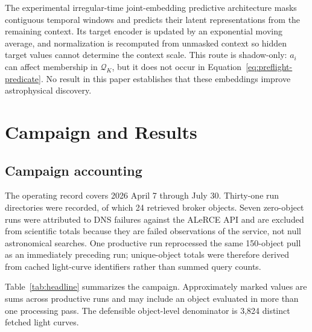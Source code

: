 \documentclass[11pt]{article}
\begin{document}
The experimental irregular-time joint-embedding predictive architecture masks contiguous temporal windows and predicts their latent representations from the remaining context. Its target encoder is updated by an exponential moving average, and normalization is recomputed from unmasked context so hidden target values cannot determine the context scale. This route is shadow-only: $a_i$ can affect membership in $\mathcal{Q}_K$, but it does not occur in Equation~\ref{eq:preflight-predicate}. No result in this paper establishes that these embeddings improve astrophysical discovery.

\section{Campaign and Results}
\label{sec:campaign}

\subsection{Campaign accounting}

The operating record covers 2026 April 7 through July 30. Thirty-one run directories were recorded, of which 24 retrieved broker objects. Seven zero-object runs were attributed to DNS failures against the ALeRCE API and are excluded from scientific totals because they are failed observations of the service, not null astronomical searches. One productive run reprocessed the same 150-object pull as an immediately preceding run; unique-object totals were therefore derived from cached light-curve identifiers rather than summed query counts.

Table~\ref{tab:headline} summarizes the campaign. Approximately marked values are sums across productive runs and may include an object evaluated in more than one processing pass. The defensible object-level denominator is 3,824 distinct fetched light curves.
\end{document}
